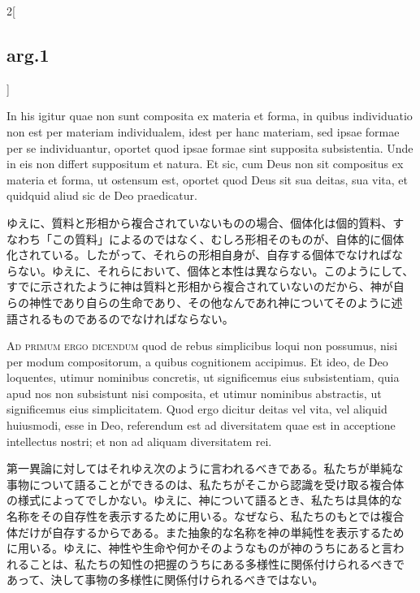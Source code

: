 \documentclass[paper=a4paper,fontsize=10pt,jafontsize=9pt,titlepage]{jlreq}
\begin{document}
\begin{paracol}{2}[\subsection{arg.1}]
\switchcolumn*

In his igitur quae non sunt composita ex materia et forma, in quibus
individuatio non est per materiam individualem, idest per hanc
materiam, sed ipsae formae per se individuantur, oportet quod ipsae
formae sint supposita subsistentia.  Unde in eis non differt
suppositum et natura.  Et sic, cum Deus non sit compositus ex materia
et forma, ut ostensum est, oportet quod Deus sit sua deitas, sua vita,
et quidquid aliud sic de Deo praedicatur.

\switchcolumn

ゆえに、質料と形相から複合されていないものの場合、個体化は個的質料、す
なわち「この質料」によるのではなく、むしろ形相そのものが、自体的に個体
化されている。したがって、それらの形相自身が、自存する個体でなければな
らない。ゆえに、それらにおいて、個体と本性は異ならない。このようにして、
すでに示されたように神は質料と形相から複合されていないのだから、神が自
らの神性であり自らの生命であり、その他なんであれ神についてそのように述
語されるものであるのでなければならない。

\switchcolumn*[\subsection{ad.1}]

\textsc{Ad primum ergo dicendum} quod de rebus simplicibus loqui non
possumus, nisi per modum compositorum, a quibus cognitionem accipimus.
Et ideo, de Deo loquentes, utimur nominibus concretis, ut significemus
eius subsistentiam, quia apud nos non subsistunt nisi composita, et
utimur nominibus abstractis, ut significemus eius simplicitatem.  Quod
ergo dicitur deitas vel vita, vel aliquid huiusmodi, esse in Deo,
referendum est ad diversitatem quae est in acceptione intellectus
nostri; et non ad aliquam diversitatem rei.

\switchcolumn

第一異論に対してはそれゆえ次のように言われるべきである。私たちが単純な
事物について語ることができるのは、私たちがそこから認識を受け取る複合体
の様式によってでしかない。ゆえに、神について語るとき、私たちは具体的な
名称をその自存性を表示するために用いる。なぜなら、私たちのもとでは複合
体だけが自存するからである。また抽象的な名称を神の単純性を表示するため
に用いる。ゆえに、神性や生命や何かそのようなものが神のうちにあると言わ
れることは、私たちの知性の把握のうちにある多様性に関係付けられるべきで
あって、決して事物の多様性に関係付けられるべきではない。

\switchcolumn*[\subsection{ad.2}]


\end{paracol}
\end{document}

